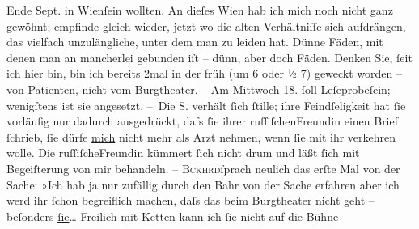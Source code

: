 \begin{ledgroupsized}[t]{13cm}
               Ende Sept. in Wienſein wollten. An dieſes Wien hab ich mich noch nicht ganz gewöhnt; empfinde gleich
               wieder, jetzt wo die alten Verhältniſſe sich aufdrängen, das vielfach unzulängliche,
               unter dem man zu leiden hat. Dünne Fäden, mit denen {\pb}man an mancherlei gebunden iſt – dünn, aber doch Fäden. Denken Sie, ſeit ich hier
               bin, bin ich bereits 2mal in der früh \introOben{}(um 6 oder ½ 7)\introOben{}
               geweckt worden – von Patienten, nicht vom Burgtheater. – Am Mittwoch 18. ſoll Leſeprobeſein; wenigſtens ist sie angesetzt.\pend
           \pstart
           – Die S. verhält ſich ſtille; ihre
               Feindſeligkeit hat ſie vorläufig nur dadurch ausgedrückt, daſs ſie ihrer ruſſiſchenFreundin einen Brief
               ſchrieb, ſie dürfe \uline{mich} nicht mehr als Arzt nehmen,
               wenn ſie mit ihr verkehren wolle. Die ruſſiſcheFreundin kümmert ſich nicht
               drum {\pb}und läßt ſich mit Begeiſterung von mir
               behandeln. – \textsc{Bckhrd}ſprach neulich das erſte Mal von der Sache: »Ich
               hab ja nur zufällig durch den Bahr von der
               Sache erfahren {\dotstwo} aber ich werd ihr ſchon begreiflich
               machen, daſs das beim Burgtheater nicht geht –
               beſonders \uline{ſie}{\dots} Freilich mit Ketten kann ich ſie nicht auf die Bühne

\end{ledgroupsized}
